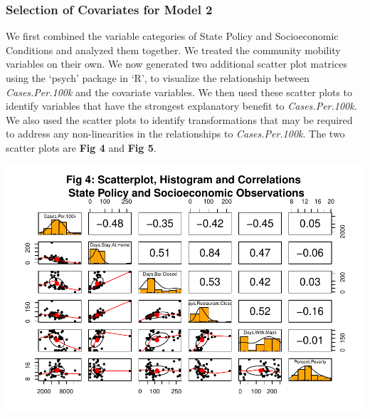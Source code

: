 \documentclass[
]{article}
\begin{document}
\hypertarget{selection-of-covariates-for-model-2}{%
\subsubsection{Selection of Covariates for Model
2}\label{selection-of-covariates-for-model-2}}

We first combined the variable categories of State Policy and
Socioeconomic Conditions and analyzed them together. We treated the
community mobility variables on their own. We now generated two
additional scatter plot matrices using the `psych' package in `R', to
visualize the relationship between \emph{Cases.Per.100k} and the
covariate variables. We then used these scatter plots to identify
variables that have the strongest explanatory benefit to
\emph{Cases.Per.100k}. We also used the scatter plots to identify
transformations that may be required to address any non-linearities in
the relationships to \emph{Cases.Per.100k}. The two scatter plots are
\textbf{Fig 4} and \textbf{Fig 5}.

\includegraphics{Final_Report_files/figure-latex/psych-1-1.pdf}
\end{document}
